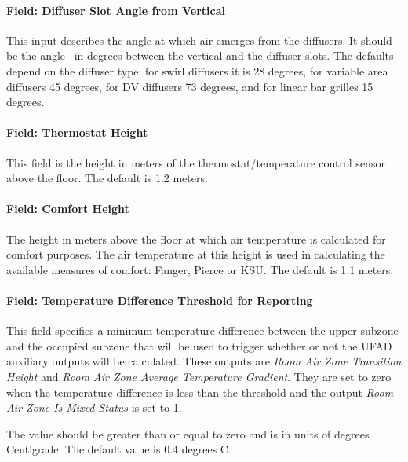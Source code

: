 \paragraph{Field: Diffuser Slot Angle from Vertical}\label{field-diffuser-slot-angle-from-vertical-1}

This input describes the angle at which air emerges from the diffusers. It should be the angle~ in degrees between the vertical and the diffuser slots. The defaults depend on the diffuser type: for swirl diffusers it is 28 degrees, for variable area diffusers 45 degrees, for DV diffusers 73 degrees, and for linear bar grilles 15 degrees.

\paragraph{Field: Thermostat Height}\label{field-thermostat-height-3}

This field is the height in meters of the thermostat/temperature control sensor above the floor. The default is 1.2 meters.

\paragraph{Field: Comfort Height}\label{field-comfort-height-2}

The height in meters above the floor at which air temperature is calculated for comfort purposes. The air temperature at this height is used in calculating the available measures of comfort: Fanger, Pierce or KSU. The default is 1.1 meters.

\paragraph{Field: Temperature Difference Threshold for Reporting}\label{field-temperature-difference-threshold-for-reporting-2}

This field specifies a minimum temperature difference between the upper subzone and the occupied subzone that will be used to trigger whether or not the UFAD auxiliary outputs will be calculated. These outputs are \emph{Room Air Zone Transition Height} and \emph{Room Air Zone Average Temperature Gradient}. They are set to zero when the temperature difference is less than the threshold and the output \emph{Room Air Zone Is Mixed Status} is set to 1.

The value should be greater than or equal to zero and is in units of degrees Centigrade. The default value is 0.4 degrees C.

